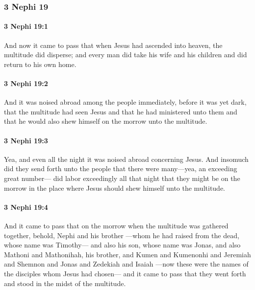 	\subsubsection{3 Nephi 19} %
		\label{3NEPHI-19}
		
		\paragraph{3 Nephi 19:1} %
			\label{3NEPHI-19-1}

			And now it came to pass that
			when Jesus had ascended into heaven,
			the multitude did disperse;
			and every man did take his wife and his children
			and did return to his own home.

		\paragraph{3 Nephi 19:2} %
			\label{3NEPHI-19-2}

			And it was noised abroad among the people immediately,
			before it was yet dark,
			that the multitude had seen Jesus
			and that he had ministered unto them
			and that he would also shew himself on the morrow unto the multitude.

		\paragraph{3 Nephi 19:3} %
			\label{3NEPHI-19-3}

			Yea, and even all the night it was noised abroad concerning Jesus.
			And insomuch did they send forth unto the people
			that there were many---yea, an exceeding great number---
			did labor exceedingly all that night
			that they might be on the morrow in the place
			where Jesus should shew himself unto the multitude.

		\paragraph{3 Nephi 19:4} %
			\label{3NEPHI-19-4}

			And it came to pass that on the morrow
			when the multitude was gathered together,
			behold, Nephi and his brother
			---whom he had raised from the dead, whose name was Timothy---
			and also his son, whose name was Jonas,
			and also Mathoni and Mathonihah, his brother,
			and Kumen and Kumenonhi and Jeremiah and Shemnon
			and Jonas and Zedekiah and Isaiah
			---now these were the names of the disciples whom Jesus had chosen---
			and it came to pass that they went forth and stood in the midst of the multitude.

